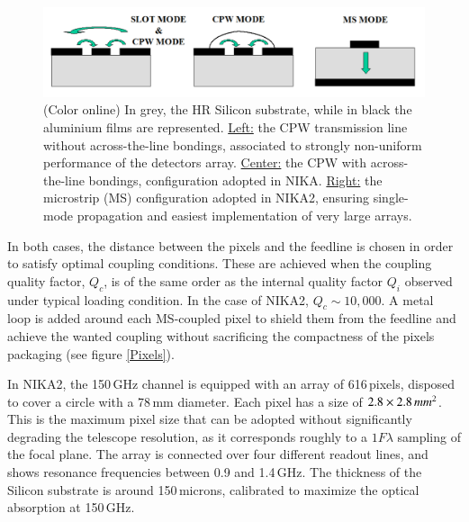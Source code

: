 \documentclass[]{aa} %
\begin{document}
\begin{figure}[h]
   \centering
    \includegraphics[width=.95\linewidth]{CPWvsMS.png}
      \caption{(Color online) In grey, the HR Silicon substrate, while in black the aluminium films are represented. \underline{Left:} the CPW transmission line without across-the-line bondings, associated to strongly non-uniform performance of the detectors array. \underline{Center:} the CPW with across-the-line bondings, configuration adopted in NIKA. \underline{Right:} the microstrip (MS) configuration adopted in NIKA2, ensuring single-mode propagation and easiest implementation of very large arrays.}
         \label{CPWvsMS}
\end{figure}

In both cases, the distance between the pixels and the feedline is chosen in order to satisfy optimal coupling conditions. These are achieved when the coupling quality factor, $Q_c$, is of the same order as the internal quality factor $Q_i$ observed under typical loading condition. In the case of NIKA2, $Q_c\sim10,000$. A metal loop is added around each MS-coupled pixel to shield them from the feedline and achieve the wanted coupling without sacrificing the compactness of the pixels packaging (see figure \ref{Pixels}). 

In NIKA2, the 150\,GHz channel is equipped with an array of 616\,pixels, disposed to cover a circle with a 78\,mm diameter. Each pixel has a size of $2.8\times2.8\textrm\,{mm}^2$. This is the maximum pixel size that can be adopted without significantly degrading the telescope resolution, as it corresponds roughly to a $1 F \lambda$ sampling of the focal plane. The array is connected over four different readout lines, and shows resonance frequencies between 0.9 and 1.4\,GHz. The thickness of the Silicon substrate is around 150\,microns, calibrated to maximize the optical absorption at 150\,GHz. 
\end{document}
